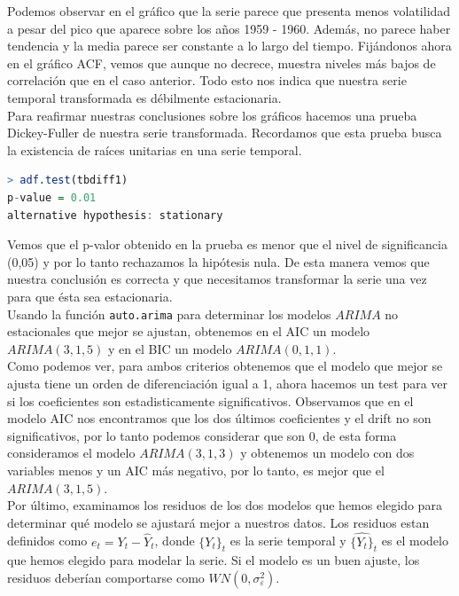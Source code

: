 \documentclass[a4paper,]{article}
\begin{document}
Podemos observar en el gráfico que la serie parece que presenta menos volatilidad a pesar del pico que aparece sobre los años 1959 - 1960. Además, no parece haber tendencia y la media parece ser constante a lo largo del tiempo. Fijándonos ahora en el gráfico ACF, vemos que aunque no decrece, muestra niveles más bajos de correlación que en el caso anterior. Todo esto nos indica que nuestra serie temporal transformada es débilmente estacionaria. \\

Para reafirmar nuestras conclusiones sobre los gráficos hacemos una prueba Dickey-Fuller de nuestra serie transformada. Recordamos que esta prueba busca la existencia de raíces unitarias en una serie temporal. 
\begin{lstlisting}[language=R]
> adf.test(tbdiff1)
p-value = 0.01
alternative hypothesis: stationary
\end{lstlisting}
Vemos que el p-valor obtenido en la prueba es menor que el nivel de significancia (0,05) y por lo tanto rechazamos la hipótesis nula. De esta manera vemos que nuestra conclusión es correcta y que necesitamos transformar la serie una vez para que ésta sea estacionaria. \\


Usando la función \texttt{auto.arima} para determinar los modelos $ARIMA$ no estacionales que mejor se ajustan, obtenemos en el AIC un modelo $ARIMA(3,1,5)$ y en el BIC un modelo $ARIMA(0,1,1)$. \\

Como podemos ver, para ambos criterios obtenemos que el modelo que mejor se ajusta tiene un orden de diferenciación igual a 1, ahora hacemos un test para ver si los coeficientes son estadisticamente significativos. Observamos que en el modelo AIC nos encontramos que los dos últimos coeficientes y el drift no son significativos, por lo tanto podemos considerar que son 0, de esta forma consideramos el modelo $ARIMA(3,1,3)$ y obtenemos un modelo con dos variables menos y un AIC más negativo, por lo tanto, es mejor que el $ARIMA(3,1,5)$. \\

Por último, examinamos los residuos de los dos modelos que hemos elegido para determinar qué modelo se ajustará mejor a nuestros datos. Los residuos estan definidos como $e_t=Y_t-\hat{Y}_t$, donde $\{Y_t\}_t$ es la serie temporal y $\hat{\{Y_t\}}_t$ es el modelo que hemos elegido para modelar la serie. Si el modelo es un buen ajuste, los residuos deberían comportarse como $WN(0,\sigma^2_\varepsilon)$.\\
\end{document}
